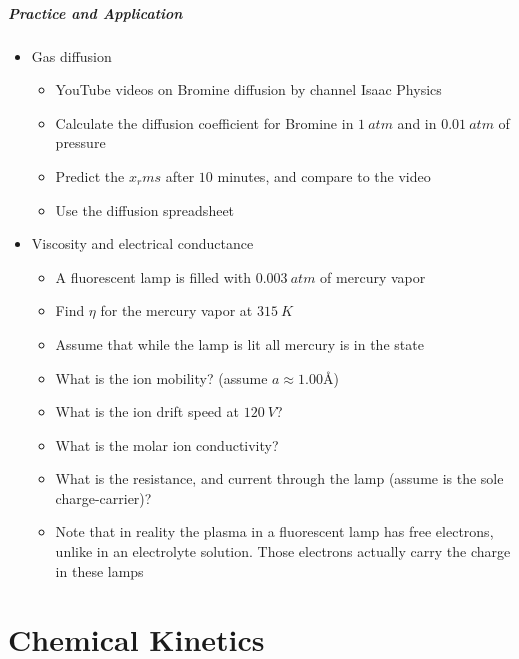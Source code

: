 \documentclass[12pt, openany, letterpaper]{memoir}
\begin{document}
\paragraph*{Practice and Application}
\begin{itemize}
	\item Gas diffusion
	\begin{itemize}
		\item YouTube videos on Bromine diffusion by channel Isaac Physics
		\item Calculate the diffusion coefficient for Bromine in $1~atm$ and in $0.01~atm$ of pressure
		\item Predict the $x_rms$ after $10$ minutes, and compare to the video
		\item Use the diffusion spreadsheet
	\end{itemize}
	\item Viscosity and electrical conductance
	\begin{itemize}
		\item A fluorescent lamp is filled with $0.003~atm$ of mercury vapor
		\item Find $\eta$ for the mercury vapor at $315~K$
		\item Assume that while the lamp is lit all mercury is in the  state
		\item What is the ion mobility? (assume $a\approx1.00$\AA)
		\item What is the ion drift speed at $120~V$?
		\item What is the molar ion conductivity?
		\item What is the resistance, and current through the lamp (assume  is the sole charge-carrier)?
		\item Note that in reality the plasma in a fluorescent lamp has free electrons, unlike in an electrolyte solution. Those electrons actually carry the charge in these lamps
	\end{itemize}
\end{itemize}

\chapter{Chemical Kinetics}
\end{document}

